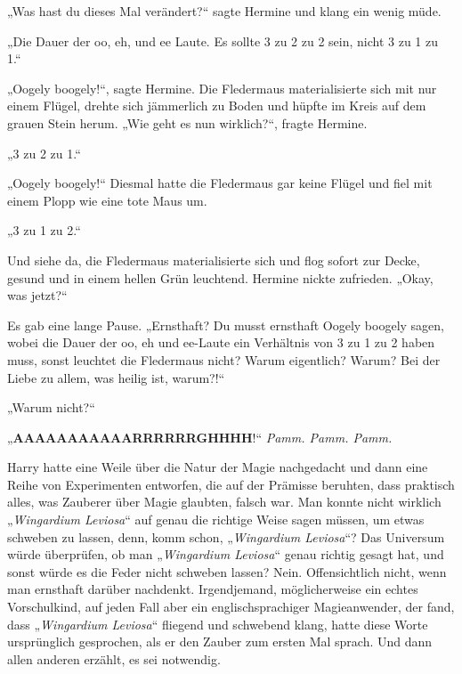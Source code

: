 {„Was hast du dieses Mal verändert?“ sagte Hermine und klang ein wenig müde.

„Die Dauer der oo, eh, und ee Laute. Es sollte 3 zu 2 zu 2 sein, nicht 3 zu 1 zu 1.“

„Oogely boogely!“, sagte Hermine. Die Fledermaus materialisierte sich mit nur einem Flügel, drehte sich jämmerlich zu Boden und hüpfte im Kreis auf dem grauen Stein herum. „Wie geht es nun wirklich?“, fragte Hermine.

„3 zu 2 zu 1.“

„Oogely boogely!“ Diesmal hatte die Fledermaus gar keine Flügel und fiel mit einem Plopp wie eine tote Maus um.

„3 zu 1 zu 2.“

Und siehe da, die Fledermaus materialisierte sich und flog sofort zur Decke, gesund und in einem hellen Grün leuchtend. Hermine nickte zufrieden. „Okay, was jetzt?“

Es gab eine lange Pause. „Ernsthaft? Du musst ernsthaft Oogely boogely sagen, wobei die Dauer der oo, eh und ee-Laute ein Verhältnis von 3 zu 1 zu 2 haben muss, sonst leuchtet die Fledermaus nicht? Warum eigentlich? Warum? Bei der Liebe zu allem, was heilig ist, warum?!“

„Warum nicht?“

„\textbf{AAAAAAAAAAARRRRRRGHHHH}!“ \emph{Pamm. Pamm. Pamm.}

Harry hatte eine Weile über die Natur der Magie nachgedacht und dann eine Reihe von Experimenten entworfen, die auf der Prämisse beruhten, dass praktisch alles, was Zauberer über Magie glaubten, falsch war. Man konnte nicht wirklich „\emph{Wingardium Leviosa}“ auf genau die richtige Weise sagen müssen, um etwas schweben zu lassen, denn, komm schon, „\emph{Wingardium Leviosa}“? Das Universum würde überprüfen, ob man „\emph{Wingardium Leviosa}“ genau richtig gesagt hat, und sonst würde es die Feder nicht schweben lassen? Nein. Offensichtlich nicht, wenn man ernsthaft darüber nachdenkt. Irgendjemand, möglicherweise ein echtes Vorschulkind, auf jeden Fall aber ein englischsprachiger Magieanwender, der fand, dass „\emph{Wingardium Leviosa}“ fliegend und schwebend klang, hatte diese Worte ursprünglich gesprochen, als er den Zauber zum ersten Mal sprach. Und dann allen anderen erzählt, es sei notwendig.

}
